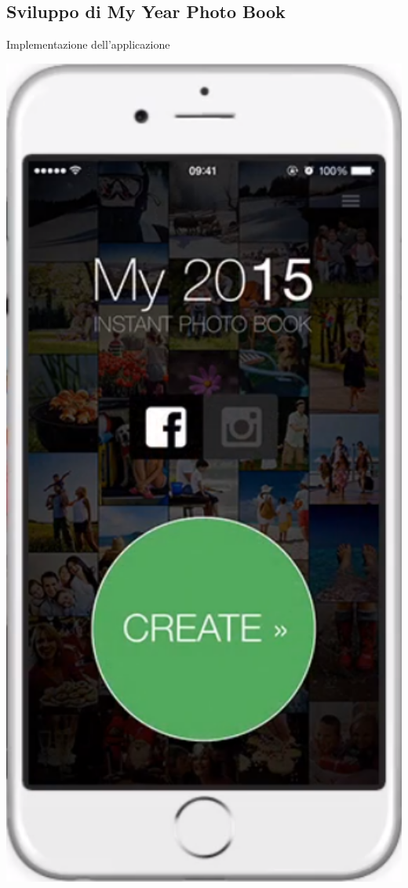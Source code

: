 	\subsection{Sviluppo di My Year Photo Book}
		\begin{frame}{Implementazione dell'applicazione}
			\begin{minipage}{0.49\textwidth}
				\begin{minipage}{0.32\textwidth}
					\includegraphics[width=1.0\textwidth]{capitolo_3/immagini/schermata_principale.png}

\end{minipage}
\end{minipage}
\end{frame}
